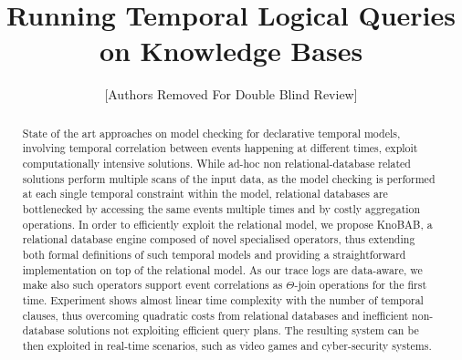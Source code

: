 \documentclass[11pt]{article}
\begin{document}
\title{Running Temporal Logical Queries on Knowledge Bases}
\author{[Authors Removed For Double Blind Review]}
\date{\vspace{-10ex}}

\maketitle
~\\
\begin{abstract}
	
State of the art approaches on model checking for declarative temporal models, involving temporal correlation between events happening at different times, exploit computationally intensive solutions. While ad-hoc non relational-database related solutions perform multiple scans of the input data, as the model checking is performed at each single temporal constraint within the model, relational databases are bottlenecked by accessing the same events multiple times and by costly aggregation operations. In order to efficiently exploit the relational model, we propose KnoBAB, a relational database engine composed of novel specialised operators, thus extending both formal definitions of such temporal models and providing a straightforward implementation on top of the relational model. As our trace logs are data-aware, we make also such operators support event correlations as $\Theta$-join operations for the first time. Experiment shows almost linear time complexity with the number of temporal clauses, thus overcoming quadratic costs from relational databases and inefficient non-database solutions not exploiting efficient query plans. The resulting system can be then exploited in real-time scenarios, such as video games and cyber-security systems.


\end{abstract}
\end{document}
